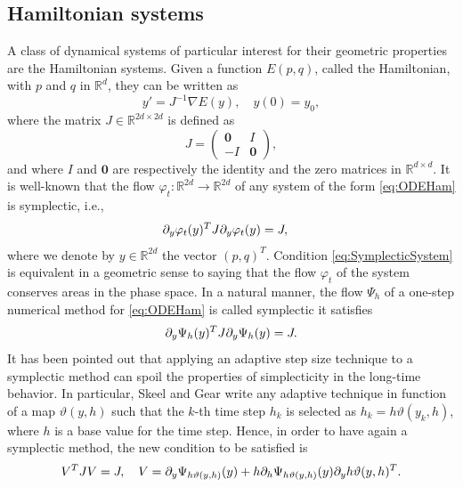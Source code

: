 \documentclass{siamart1116}
\numberwithin{theorem}{section}
\renewcommand{\phi}{\varphi}
\newcommand{\pdv}[2]{\ensuremath\partial_{#2}#1}
\newcommand{\R}{\mathbb{R}}
\begin{document}
\subsection{Hamiltonian systems} A class of dynamical systems of particular interest for their geometric properties are the Hamiltonian systems. Given a function $E(p, q)$, called the Hamiltonian, with $p$ and $q$ in $\R^d$, they can be written as
\begin{equation}\label{eq:ODEHam}
y' = J^{-1}\nabla E(y), \quad y(0) = y_0,
\end{equation}
where the matrix $J\in\R^{2d \times 2d}$ is defined as
\begin{equation}
J = \begin{pmatrix} \mathbf{0} & I \\ -I & \mathbf{0} \end{pmatrix},
\end{equation}
and where $I$ and $\mathbf{0}$ are respectively the identity and the zero matrices in $\R^{d\times d}$. It is well-known that the flow $\phi_t\colon\R^{2d}\to\R^{2d}$ of any system of the form \eqref{eq:ODEHam} is symplectic, i.e., 
\begin{equation}\label{eq:SymplecticSystem}
\pdv{\phi_t(y)}{y}^T J \pdv{\phi_t(y)}{y} = J, \quad  
\end{equation}
where we denote by $y\in \R^{2d}$ the vector $(p, q)^T$. Condition \eqref{eq:SymplecticSystem} is equivalent in a geometric sense to saying that the flow $\phi_t$ of the system conserves areas in the phase space. In a natural manner, the flow $\Psi_h$ of a one-step numerical method for \eqref{eq:ODEHam} is called symplectic it satisfies
\begin{equation}\label{eq:SymplecticMethod}
\pdv{\Psi_h(y)}{y}^T J \pdv{\Psi_h(y)}{y} = J.
\end{equation}
It has been pointed out \cite{SkG92, HLW06} that applying an adaptive step size technique to a symplectic method can spoil the properties of simplecticity in the long-time behavior. In particular, Skeel and Gear \cite{SkG92} write any adaptive technique in function of a map $\vartheta(y, h)$ such that the $k$-th time step $h_k$ is selected as $h_k = h\vartheta(y_k, h)$, where $h$ is a base value for the time step. Hence, in order to have again a symplectic method, the new condition to be satisfied is
\begin{equation}
V^T J V = J, \quad V = \pdv{\Psi_{h\vartheta(y, h)}(y)}{y} + h\pdv{\Psi_{h\vartheta(y, h)}(y)}{h}\pdv{h\vartheta(y, h)}{y}^T.
\end{equation}
\end{document}
